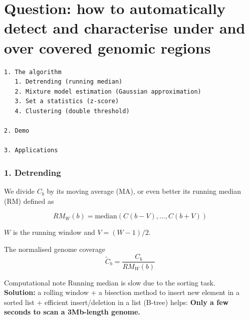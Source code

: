 \documentclass{beamer}
\begin{document}
\section{
Question: how to automatically detect and characterise under and 
over covered genomic regions}



\begin{frame}[fragile]
 \begin{verbatim}
1. The algorithm
   1. Detrending (running median)
   2. Mixture model estimation (Gaussian approximation)
   3. Set a statistics (z-score)
   4. Clustering (double threshold)
   
2. Demo

3. Applications
\end{verbatim}
\end{frame}


\begin{frame}
\frametitle{1. Detrending}
 
We divide $C_b$ by its moving average (MA), or even better its 
running median (RM) defined as 

\begin{equation}
RM_W(b) = \textrm{median}\left({C(b-V), \dots , C(b+V)}\right) \nonumber
\end{equation}

$W$ is the running window and $V=(W-1)/2$.

\begin{block}{The normalised genome coverage}
\begin{equation}
\widetilde{C}_b = \frac{C_b}{RM_W(b)}  \nonumber
\end{equation}
\end{block}

\pause

\begin{block}{Computational note}
Running median is slow due to the sorting task. \\
\textbf{Solution:} a rolling window + a bisection method to insert 
new element in a sorted list + efficient insert/deletion in a 
list (B-tree) helps:  \textbf{Only a few seconds to scan a 3Mb-length genome.}
\end{block} 
\end{frame}
\end{document}
